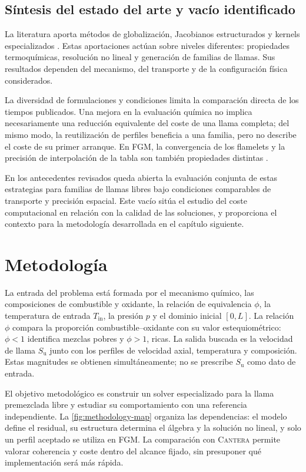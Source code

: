 \documentclass[12pt,a4paper,twoside,openany]{book}
\newcommand{\Su}{S_{\mathrm{u}}}
\newcommand{\Tin}{T_{\mathrm{in}}}
\newcommand{\Cantera}{\textsc{Cantera}\xspace}
\begin{document}
\section{Síntesis del estado del arte y vacío identificado}
\label{sec:research-gap}

La literatura aporta métodos de globalización, Jacobianos estructurados y
kernels especializados \cite{Grcar1988,KelleyKeyes1998,Lapointe2019,
DanciuKinetiX2025}. Estas aportaciones actúan sobre niveles diferentes:
propiedades termoquímicas, resolución no lineal y generación de familias de
llamas. Sus resultados dependen del mecanismo, del transporte y de la
configuración física considerados.

La diversidad de formulaciones y condiciones limita la comparación directa
de los tiempos publicados. Una mejora en la evaluación química no implica
necesariamente una reducción equivalente del coste de una llama completa;
del mismo modo, la reutilización de perfiles beneficia a una familia, pero
no describe el coste de su primer arranque. En FGM, la convergencia de los
flamelets y la precisión de interpolación de la tabla son también propiedades
distintas \cite{vanOijenReview2016}.

En los antecedentes revisados queda abierta la evaluación conjunta de estas
estrategias para familias de llamas libres bajo condiciones comparables de
transporte y precisión espacial. Este vacío sitúa el estudio del coste
computacional en relación con la calidad de las soluciones, y proporciona
el contexto para la metodología desarrollada en el capítulo siguiente.



\chapter{Metodología}
\label{chap:metodologia}

La entrada del problema está formada por el mecanismo químico, las composiciones
de combustible y oxidante, la relación de equivalencia \(\phi\), la temperatura
de entrada \(\Tin\), la presión \(p\) y el dominio inicial \([0,L]\).
La relación \(\phi\) compara la proporción combustible--oxidante con su valor
estequiométrico: \(\phi<1\) identifica mezclas pobres y \(\phi>1\), ricas.
La salida buscada es la velocidad de llama \(\Su\) junto con los perfiles de
velocidad axial, temperatura y composición. Estas magnitudes se obtienen
simultáneamente; no se prescribe \(\Su\) como dato de entrada.

El objetivo metodológico es construir un solver especializado para la llama
premezclada libre y estudiar su comportamiento con una referencia independiente.
La \cref{fig:methodology-map} organiza las dependencias: el modelo define el
residual, su estructura determina el álgebra y la solución no lineal, y solo un
perfil aceptado se utiliza en FGM. La comparación con \Cantera permite valorar
coherencia y coste dentro del alcance fijado, sin presuponer qué implementación
será más rápida.
\end{document}
